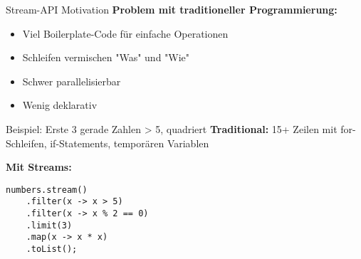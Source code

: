 \begin{frame}[fragile]{Stream-API Motivation}
  \textbf{Problem mit traditioneller Programmierung:}
  \begin{itemize}
    \item Viel Boilerplate-Code für einfache Operationen
    \item Schleifen vermischen "Was" und "Wie"
    \item Schwer parallelisierbar
    \item Wenig deklarativ
  \end{itemize}

  \begin{exampleblock}{Beispiel: Erste 3 gerade Zahlen > 5, quadriert}
    \textbf{Traditional:} 15+ Zeilen mit for-Schleifen, if-Statements, temporären Variablen

    \textbf{Mit Streams:}
    \begin{lstlisting}[style=java, basicstyle=\footnotesize\ttfamily]
numbers.stream()
    .filter(x -> x > 5)
    .filter(x -> x % 2 == 0)
    .limit(3)
    .map(x -> x * x)
    .toList();
    \end{lstlisting}
  \end{exampleblock}
\end{frame}

